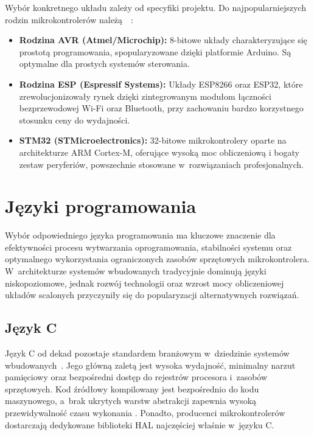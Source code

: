 Wybór konkretnego układu zależy od specyfiki projektu. 
Do najpopularniejszych rodzin mikrokontrolerów 
należą~\cite{KenResearchMCU2025}~\cite{ALLPCB_MCU2025}:
\begin{itemize}
    \item \textbf{Rodzina AVR (Atmel/Microchip):} 8-bitowe układy 
    charakteryzujące się prostotą programowania, spopularyzowane 
    dzięki platformie Arduino. Są optymalne dla prostych systemów 
    sterowania.

    \item \textbf{Rodzina ESP (Espressif Systems):} Układy ESP8266 
    oraz ESP32, które zrewolucjonizowały rynek dzięki zintegrowanym 
    modułom łączności bezprzewodowej Wi-Fi oraz Bluetooth, 
    przy zachowaniu bardzo korzystnego stosunku ceny do wydajności.

    \item \textbf{STM32 (STMicroelectronics):} 32-bitowe mikrokontrolery
    oparte na architekturze ARM Cortex-M, oferujące wysoką moc 
    obliczeniową i bogaty zestaw peryferiów, powszechnie stosowane 
    w~rozwiązaniach profesjonalnych.
\end{itemize}

\section{Języki programowania}
Wybór odpowiedniego języka programowania ma kluczowe znaczenie dla 
efektywności procesu wytwarzania oprogramowania, stabilności systemu 
oraz optymalnego wykorzystania ograniczonych zasobów sprzętowych 
mikrokontrolera. W~architekturze systemów wbudowanych tradycyjnie
dominują języki niskopoziomowe, jednak rozwój technologii oraz wzrost 
mocy obliczeniowej układów scalonych przyczyniły się do popularyzacji 
alternatywnych rozwiązań.

\subsection{Język C}
Język C od dekad pozostaje standardem branżowym w~dziedzinie systemów 
wbudowanych~\cite{BarrGroup2017SafetySecuritySurvey}. 
Jego główną zaletą jest wysoka wydajność, minimalny narzut
pamięciowy oraz bezpośredni dostęp do rejestrów procesora i~zasobów 
sprzętowych. Kod źródłowy kompilowany jest bezpośrednio do kodu 
maszynowego, a~brak ukrytych warstw abstrakcji zapewnia wysoką 
przewidywalność czasu wykonania . 
Ponadto, producenci mikrokontrolerów dostarczają dedykowane biblioteki 
HAL  najczęściej właśnie 
w~języku C.

